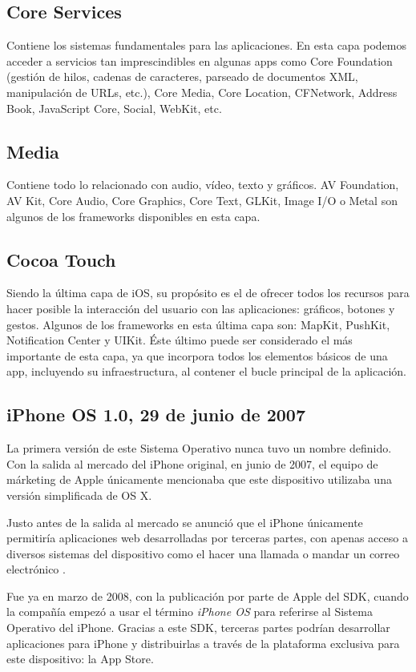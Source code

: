 \subsection*{Core Services}
Contiene los sistemas fundamentales para las aplicaciones. En esta capa podemos acceder a servicios tan imprescindibles en algunas apps como Core Foundation (gestión de hilos, cadenas de caracteres, parseado de documentos XML, manipulación de URLs, etc.), Core Media, Core Location, CFNetwork, Address Book, JavaScript Core, Social, WebKit, etc.

\subsection*{Media}
Contiene todo lo relacionado con audio, vídeo, texto y gráficos. AV Foundation, AV Kit, Core Audio, Core Graphics, Core Text, GLKit, Image I/O o Metal son algunos de los frameworks disponibles en esta capa.

\subsection*{Cocoa Touch}
Siendo la última capa de iOS, su propósito es el de ofrecer todos los recursos para hacer posible la interacción del usuario con las aplicaciones: gráficos, botones y gestos. Algunos de los frameworks en esta última capa son: MapKit, PushKit, Notification Center y UIKit. Éste último puede ser considerado el más importante de esta capa, ya que incorpora todos los elementos básicos de una app, incluyendo su infraestructura, al contener el bucle principal de la aplicación.

\subsection{iPhone OS 1.0, 29 de junio de 2007}
La primera versión de este Sistema Operativo nunca tuvo un nombre definido. Con la salida al mercado del iPhone original, en junio de 2007, el equipo de márketing de Apple únicamente mencionaba que este dispositivo utilizaba una versión simplificada de OS X.

Justo antes de la salida al mercado se anunció que el iPhone únicamente permitiría aplicaciones web desarrolladas por terceras partes, con apenas acceso a diversos sistemas del dispositivo como el hacer una llamada o mandar un correo electrónico \cite{iPhoneWebApps}.

Fue ya en marzo de 2008, con la publicación por parte de Apple del SDK, cuando la compañía empezó a usar el término \emph{iPhone OS} para referirse al Sistema Operativo del iPhone. Gracias a este SDK, terceras partes podrían desarrollar aplicaciones para iPhone y distribuirlas a través de la plataforma exclusiva para este dispositivo: la App Store.

